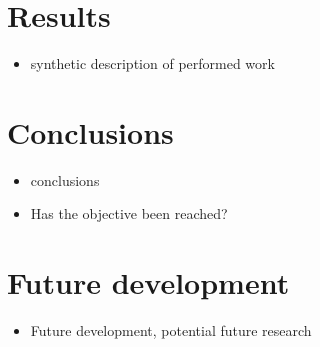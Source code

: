 \section{Results}

\begin{itemize}
    \item synthetic description of performed work
\end{itemize}


\section{Conclusions}

\begin{itemize}
    \item conclusions
    \item Has the objective been reached?
\end{itemize}


\section{Future development}

\begin{itemize}
    \item Future development, potential future research
\end{itemize}
